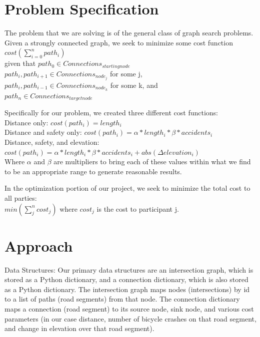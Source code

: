 \documentclass[11pt]{article}
\begin{document}
\section{Problem Specification}

The problem that we are solving is of the general class of graph search problems. Given a strongly connected graph, we seek to minimize some cost function $cost(\sum_{i=0}^n path_i)$ \\given that  $path_0 \in Connections_{starting node}$ \\$path_i, path_{i+1} \in Connections_{node_j}$ for some j, \\$path_i, path_{i-1} \in Connections_{node_k}$ for some k, and \\$path_n \in Connections_{target node}$

Specifically for our problem, we created three different cost functions:\\
Distance only: $cost(path_i)= length_i$ \\
Distance and safety only: $cost(path_i)  = \alpha* length_i * \beta * accidents_i$ \\
Distance, safety, and elevation: $cost(path_i) = \alpha* length_i * \beta * accidents_i + abs(\Delta elevation_i)$ \\

Where $\alpha$ and $\beta$ are multipliers to bring each of these values within what we find to be an appropriate range to generate reasonable results.

In the optimization portion of our project, we seek to minimize the total cost to all parties:\\
$min(\sum_j^n cost_j)$ where  $cost_j$ is the cost to participant j.

\section{Approach}

Data Structures: Our primary data structures are an intersection graph, which is stored as a Python dictionary, and a connection dictionary, which is also stored as a Python dictionary. The intersection graph maps nodes (intersections) by id to a list of paths (road segments) from that node. The connection dictionary maps a connection (road segment) to its source node, sink node, and various cost parameters (in our case distance, number of bicycle crashes on that road segment, and change in elevation over that road segment).
\end{document}
